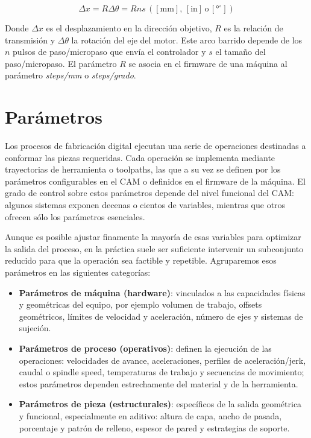 \begin{equation}
    \Delta x = R\Delta \theta = R n s \,\mathrm{([mm], \,[in]\,o\,[{°}^\circ])} 
\end{equation}

Donde $\Delta x$ es el desplazamiento en la dirección objetivo, $R$ es la relación de transmisión y $\Delta \theta$ la rotación del eje del motor. Este arco barrido depende de los $n$ pulsos de paso/micropaso que envía el controlador y $s$ el tamaño del paso/micropaso. El parámetro $R$ se asocia en el firmware de una máquina al parámetro \textit{steps/mm} o \textit{steps/grado}.

\section{Parámetros}

Los procesos de fabricación digital ejecutan una serie de operaciones destinadas a conformar las piezas requeridas. Cada operación se implementa mediante trayectorias de herramienta o toolpaths, las que a su vez se definen por los parámetros configurables en el CAM o definidos en el firmware de la máquina. El grado de control sobre estos parámetros depende del nivel funcional del CAM: algunos sistemas exponen decenas o cientos de variables, mientras que otros ofrecen sólo los parámetros esenciales.

Aunque es posible ajustar finamente la mayoría de esas variables para optimizar la salida del proceso, en la práctica suele ser suficiente intervenir un subconjunto reducido para que la operación sea factible y repetible. Agruparemos esos parámetros en las siguientes categorías:

\begin{itemize} 
	
	\item \textbf{Parámetros de máquina (hardware)}: vinculados a las capacidades físicas y geométricas del equipo, por ejemplo volumen de trabajo, offsets geométricos, límites de velocidad y aceleración, número de ejes y sistemas de sujeción. 
	\item \textbf{Parámetros de proceso (operativos)}: definen la ejecución de las operaciones: velocidades de avance, aceleraciones, perfiles de aceleración/jerk, caudal o spindle speed, temperaturas de trabajo y secuencias de movimiento; estos parámetros dependen estrechamente del material y de la herramienta. 
	\item \textbf{Parámetros de pieza (estructurales)}: específicos de la salida geométrica y funcional, especialmente en aditivo: altura de capa, ancho de pasada, porcentaje y patrón de relleno, espesor de pared y estrategias de soporte. \end{itemize}

